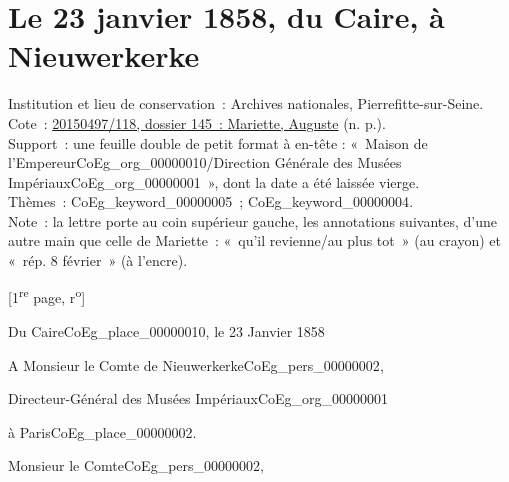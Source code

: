 \documentclass{book}
\begin{document}
\section*{Le 23 janvier 1858, du Caire, à Nieuwerkerke}  
{\footnotesize
\noindent Institution et lieu de conservation~: Archives nationales, Pierrefitte-sur-Seine.\\
Cote~: \hyperlink{CoEg_Mariette_ms_001}{20150497/118, dossier 145~: Mariette, Auguste} (n. p.).\\
Support~: une feuille double de petit format à en-tête : «~Maison de l'Empereur\gls{CoEg_org_00000010}/Direction Générale des Musées Impériaux\gls{CoEg_org_00000001}~», dont la date a été laissée vierge.\\
Thèmes~: \gls{CoEg_keyword_00000005}~; \gls{CoEg_keyword_00000004}.\\
Note~: la lettre porte au coin supérieur gauche, les annotations suivantes, d’une autre main que celle de Mariette~: «~qu’il revienne/au plus tot~» (au crayon) et «~rép. 8 février~» (à l’encre).
\begin{center} {[1\textsuperscript{re} page, r\textsuperscript{o}]}\end{center}}

\begin{flushright} Du Caire\gls{CoEg_place_00000010}, le 23 Janvier 1858\end{flushright}

\indent A Monsieur le Comte de Nieuwerkerke\gls{CoEg_pers_00000002},
\begin{center}Directeur-Général des Musées Impériaux\gls{CoEg_org_00000001}\end{center}
\begin{flushright}à Paris\gls{CoEg_place_00000002}.\end{flushright}

\hspace{1cm} Monsieur le Comte\gls{CoEg_pers_00000002},\\
\end{document}
